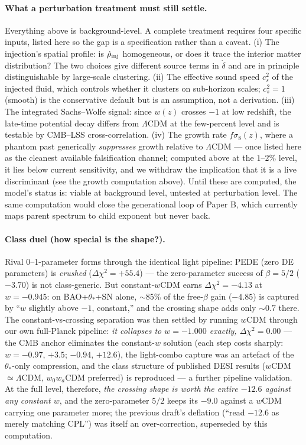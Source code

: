 \documentclass[11pt]{article}
\begin{document}
\paragraph{What a perturbation treatment must still settle.}
Everything above is background-level. A complete treatment requires four specific inputs, listed here
so the gap is a specification rather than a caveat. (i) The injection's spatial profile: is
$\dot\rho_{\rm inj}$ homogeneous, or does it trace the interior matter distribution? The two choices
give different source terms in $\dot\delta$ and are in principle distinguishable by large-scale
clustering. (ii) The effective sound speed $c_s^2$ of the injected fluid, which controls whether it
clusters on sub-horizon scales; $c_s^2 = 1$ (smooth) is the conservative default but is an assumption,
not a derivation. (iii) The integrated Sachs--Wolfe signal: since $w(z)$ crosses $-1$ at low redshift,
the late-time potential decay differs from $\Lambda$CDM at the few-percent level and is testable by
CMB--LSS cross-correlation. (iv) The growth rate $f\sigma_8(z)$, where a phantom past generically
\emph{suppresses} growth relative to $\Lambda$CDM --- once listed here as the cleanest available falsification channel; computed above at the $1$--$2\%$ level, it lies below current sensitivity, and we withdraw the implication that it is a live discriminant (see the growth computation above). Until these are computed, the
model's status is: viable at background level, untested at perturbation level. The same computation
would close the generational loop of Paper B, which currently maps parent spectrum to child exponent
but never back.

\paragraph{Class duel (how special is the shape?).} Rival 0--1-parameter forms through the identical light pipeline: PEDE (zero DE parameters) is \emph{crushed} ($\Delta\chi^2 = +55.4$) --- the zero-parameter success of $\beta = 5/2$ ($-3.70$) is not class-generic. But constant-$w$CDM earns $\Delta\chi^2 = -4.13$ at $w = -0.945$: on BAO+$\theta_*$+SN alone, $\sim$85\% of the free-$\beta$ gain ($-4.85$) is captured by ``$w$ slightly above $-1$, constant,'' and the crossing shape adds only $\sim 0.7$ there. The constant-vs-crossing separation was then settled by running $w$CDM through our own full-Planck pipeline: \emph{it collapses to $w = -1.000$ exactly, $\Delta\chi^2 = 0.00$} --- the CMB anchor eliminates the constant-$w$ solution (each step costs sharply: $w=-0.97$, $+3.5$; $-0.94$, $+12.6$), the light-combo capture was an artefact of the $\theta_*$-only compression, and the class structure of published DESI results ($w$CDM $\simeq \Lambda$CDM, $w_0w_a$CDM preferred) is reproduced --- a further pipeline validation. At the full level, therefore, \emph{the crossing shape is worth the entire $-12.6$ against any constant $w$}, and the zero-parameter $5/2$ keeps its $-9.0$ against a $w$CDM carrying one parameter more; the previous draft's deflation (``read $-12.6$ as merely matching CPL'') was itself an over-correction, superseded by this computation.
\end{document}
